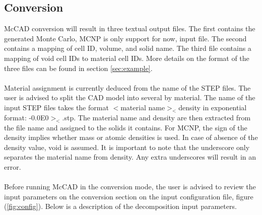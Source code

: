 \documentclass[letterpaper, 12 pt]{report}
\begin{document}
  \subsection{Conversion}
    McCAD conversion will result in three textual output files. The first contains the generated Monte Carlo, MCNP is only support for now, input file. The second contains a mapping of cell ID, volume, and solid name. The third file contains a mapping of void cell IDs to material cell IDs. More details on the format of the three files can be found in section \ref{sec:example}. \\
    \\
    Material assignment is currently deduced from the name of the STEP files. The user is advised to split the CAD model into several by material. The name of the input STEP files takes the format $<$material name$>_<$density in exponential format: -0.0E0$>_<$.stp. The material name and density are then extracted from the file name and assigned to the solids it contains. For MCNP, the sign of the density implies whether mass or atomic densities is used. In case of absence of the density value, void is assumed. It is important to note that the underscore only separates the material name from density. Any extra underscores will result in an error. \\
    \\
    Before running McCAD in the conversion mode, the user is advised to review the input parameters on the conversion section on the input configuration file, figure (\ref{fig:config}). Below is a description of the decomposition input parameters.
\end{document}
